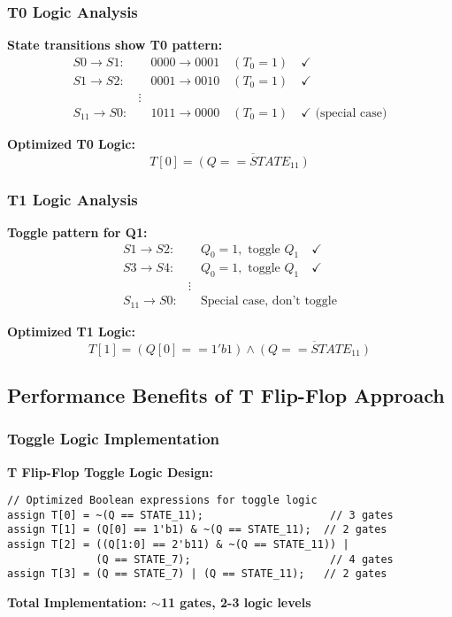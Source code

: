 \documentclass[12pt,letterpaper]{article}
\begin{document}
\subsubsection{T0 Logic Analysis}
\textbf{State transitions show T0 pattern:}
\begin{align}
S0 \rightarrow S1: &\quad 0000 \rightarrow 0001 \quad (T_0=1) \quad \checkmark \\
S1 \rightarrow S2: &\quad 0001 \rightarrow 0010 \quad (T_0=1) \quad \checkmark \\
&\vdots \\
S_{11} \rightarrow S0: &\quad 1011 \rightarrow 0000 \quad (T_0=1) \quad \checkmark \text{ (special case)}
\end{align}

\textbf{Optimized T0 Logic:}
\begin{equation}
T[0] = \overline{(Q == STATE_{11})}
\end{equation}

\subsubsection{T1 Logic Analysis}
\textbf{Toggle pattern for Q1:}
\begin{align}
S1 \rightarrow S2: &\quad Q_0=1, \text{ toggle } Q_1 \quad \checkmark \\
S3 \rightarrow S4: &\quad Q_0=1, \text{ toggle } Q_1 \quad \checkmark \\
&\vdots \\
S_{11} \rightarrow S0: &\quad \text{Special case, don't toggle}
\end{align}

\textbf{Optimized T1 Logic:}
\begin{equation}
T[1] = (Q[0] == 1'b1) \land \overline{(Q == STATE_{11})}
\end{equation}

\subsection{Performance Benefits of T Flip-Flop Approach}

\subsubsection{Toggle Logic Implementation}

\textbf{T Flip-Flop Toggle Logic Design:}
\begin{lstlisting}[caption={T Flip-Flop Implementation - Efficient Boolean Expressions}]
// Optimized Boolean expressions for toggle logic
assign T[0] = ~(Q == STATE_11);                    // 3 gates
assign T[1] = (Q[0] == 1'b1) & ~(Q == STATE_11);  // 2 gates  
assign T[2] = ((Q[1:0] == 2'b11) & ~(Q == STATE_11)) | 
              (Q == STATE_7);                      // 4 gates
assign T[3] = (Q == STATE_7) | (Q == STATE_11);   // 2 gates
\end{lstlisting}
\textbf{Total Implementation: $\sim$11 gates, 2-3 logic levels}
\end{document}
